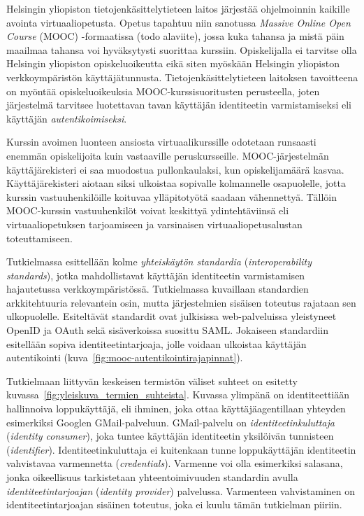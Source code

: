 \documentclass[finnish,gradu]{tktltiki}
\begin{document}
  Helsingin yliopiston tietojenkäsittelytieteen laitos järjestää ohjelmoinnin kaikille avointa virtuaaliopetusta. Opetus tapahtuu niin sanotussa \emph{Massive Online Open Course} (MOOC) -formaatissa (todo alaviite), jossa kuka tahansa ja mistä päin maailmaa tahansa voi hyväksytysti suorittaa kurssiin. Opiskelijalla ei tarvitse olla Helsingin yliopiston opiskeluoikeutta eikä siten myöskään Helsingin yliopiston verkkoympäristön käyttäjätunnusta. Tietojenkäsittelytieteen laitoksen tavoitteena on myöntää opiskeluoikeuksia MOOC-kurssisuoritusten perusteella, joten järjestelmä tarvitsee luotettavan tavan käyttäjän identiteetin varmistamiseksi eli käyttäjän \emph{autentikoimiseksi}.

  Kurssin avoimen luonteen ansiosta virtuaalikurssille odotetaan runsaasti enemmän opiskelijoita kuin vastaaville peruskursseille. MOOC-järjestelmän käyttäjärekisteri ei saa muodostua pullonkaulaksi, kun opiskelijamäärä kasvaa. Käyttäjärekisteri aiotaan siksi ulkoistaa sopivalle kolmannelle osapuolelle, jotta kurssin vastuuhenkilöille koituvaa ylläpitotyötä saadaan vähennettyä. Tällöin MOOC-kurssin vastuuhenkilöt voivat keskittyä ydintehtäviinsä eli virtuaaliopetuksen tarjoamiseen ja varsinaisen virtuaaliopetusalustan toteuttamiseen.

  Tutkielmassa esittellään kolme \emph{yhteiskäytön standardia} (\emph{interoperability standards}), jotka mahdollistavat käyttäjän identiteetin varmistamisen hajautetussa verkkoympäristössä. Tutkielmassa kuvaillaan standardien arkkitehtuuria relevantein osin, mutta järjestelmien sisäisen toteutus rajataan sen ulkopuolelle. Esiteltävät standardit ovat julkisissa web-palveluissa yleistyneet OpenID ja OAuth sekä sisäverkoissa suosittu SAML. Jokaiseen standardiin esitellään sopiva identiteetintarjoaja, jolle voidaan ulkoistaa käyttäjän autentikointi (kuva~\ref{fig:mooc-autentikointirajapinnat}).

  Tutkielmaan liittyvän keskeisen termistön väliset suhteet on esitetty kuvassa~\ref{fig:yleiskuva_termien_suhteista}. Kuvassa ylimpänä on identiteettiään hallinnoiva loppukäyttäjä, eli ihminen, joka ottaa käyttäjäagentillaan yhteyden esimerkiksi Googlen GMail-palveluun. GMail-palvelu on \emph{identiteetinkuluttaja} (\emph{identity consumer}), joka tuntee käyttäjän identiteetin yksilöivän tunnisteen (\emph{identifier}). Identiteetinkuluttaja ei kuitenkaan tunne loppukäyttäjän identiteetin vahvistavaa varmennetta (\emph{credentials}). Varmenne voi olla esimerkiksi salasana, jonka oikeellisuus tarkistetaan yhteentoimivuuden standardin avulla \emph{identiteetintarjoajan} (\emph{identity provider}) palvelussa. Varmenteen vahvistaminen on identiteetintarjoajan sisäinen toteutus, joka ei kuulu tämän tutkielman piiriin.
\end{document}
